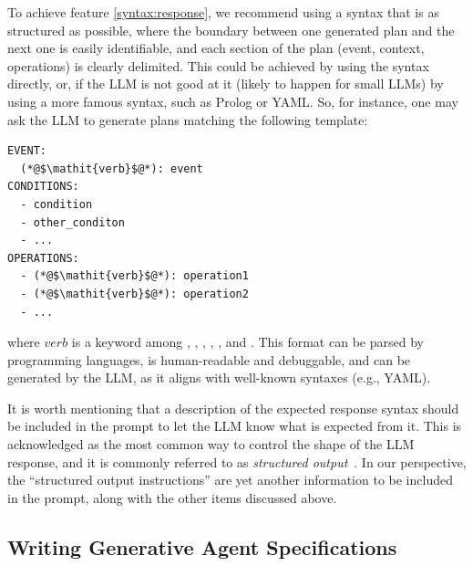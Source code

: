 To achieve feature \ref{syntax:response},
we recommend using a syntax that is as structured as possible,
where the boundary between one generated plan and the next one is easily identifiable,
and each section of the plan
(event, context, operations)
is clearly delimited.
%
This could be achieved by using the \agentspeak{} syntax directly,
or,
if the \ac{LLM} is not good at it
(likely to happen for small \acp{LLM})
by using a more famous syntax,
such as Prolog or YAML.
%
So,
for instance,
one may ask the \ac{LLM} to generate plans matching the following template:
%
\begin{lstlisting}
EVENT:
  (*@$\mathit{verb}$@*): event
CONDITIONS:
  - condition
  - other_conditon
  - ...
OPERATIONS:
  - (*@$\mathit{verb}$@*): operation1
  - (*@$\mathit{verb}$@*): operation2
  - ...
\end{lstlisting}
%
where $\mathit{verb}$ is a keyword among , , , , , and .
%
This format can be parsed by programming languages, 
is human-readable and debuggable, 
and can be generated by the \ac{LLM}, 
as it aligns with well-known syntaxes (e.g., YAML).

It is worth mentioning that
a description of the expected response syntax should be included in the prompt
to let the \ac{LLM} know what is expected from it.
%
This is acknowledged as the most common way to control the shape of the \ac{LLM} response,
and it is commonly referred to as \emph{structured output}~\cite{TangZPZCG23}.
%
In our perspective,
the ``structured output instructions'' are yet another information to be included in the prompt,
along with the other items discussed above.

\subsection{Writing Generative Agent Specifications}\label{sec:writing}


